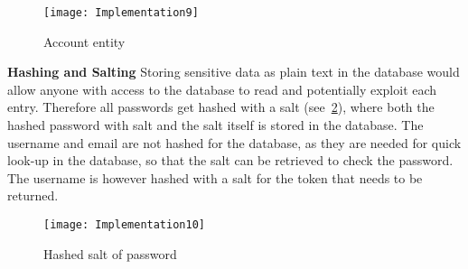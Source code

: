 \begin{figure}[h]
\centerline{\texttt{[image: Implementation9]}}
\caption {Account entity}
\label {fig:implementation9}
\end{figure}

\textbf {Hashing and Salting}
Storing sensitive data as plain text in the database would allow
anyone with access to the database to read and potentially exploit
each entry. Therefore all passwords get hashed with a
salt (see~\ref{fig:implementation10}), where both the hashed password with
 salt and the salt itself is stored in the database. The username and email
  are not hashed for the database, as they are needed for quick look-up in
   the database, so that the salt can be retrieved to check the password.
    The username is however hashed with a salt for the token that needs to
     be returned.

\begin{figure}[h]
\centerline{\texttt{[image: Implementation10]}}
\caption {Hashed salt of password}
\label {fig:implementation10}
\end{figure}
